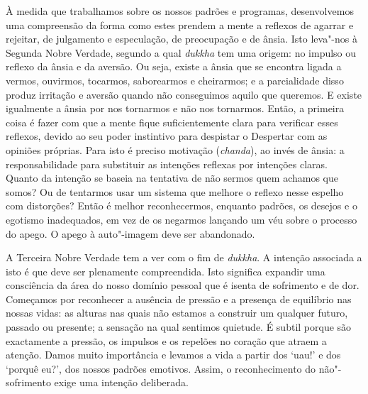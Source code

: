 À medida que trabalhamos sobre os nossos padrões e programas, desenvolvemos uma
compreensão da forma como estes prendem a mente a reflexos de agarrar e
rejeitar, de julgamento e especulação, de preocupação e de ânsia. Isto leva"-nos
à Segunda Nobre Verdade, segundo a qual \emph{dukkha} tem uma origem: no impulso
ou reflexo da ânsia e da aversão. Ou seja, existe a ânsia que se encontra ligada
a vermos, ouvirmos, tocarmos, saborearmos e cheirarmos; e a parcialidade disso
produz irritação e aversão quando não conseguimos aquilo que queremos. E existe
igualmente a ânsia por nos tornarmos e não nos tornarmos. Então, a primeira
coisa é fazer com que a mente fique suficientemente clara para verificar esses
reflexos, devido ao seu poder instintivo para despistar o Despertar com as
opiniões próprias. Para isto é preciso motivação (\emph{chanda}), ao invés de
ânsia: a responsabilidade para substituir as intenções reflexas por intenções
claras. Quanto da intenção se baseia na tentativa de não sermos quem achamos que
somos? Ou de tentarmos usar um sistema que melhore o reflexo nesse espelho com
distorções? Então é melhor reconhecermos, enquanto padrões, os desejos e o
egotismo inadequados, em vez de os negarmos lançando um véu sobre o processo do
apego. O apego à auto"-imagem deve ser abandonado.

A Terceira Nobre Verdade tem a ver com o fim de \emph{dukkha}. A intenção
associada a isto é que deve ser plenamente compreendida. Isto significa expandir
uma consciência da área do nosso domínio pessoal que é isenta de sofrimento e de
dor. Começamos por reconhecer a ausência de pressão e a presença de equilíbrio
nas nossas vidas: as alturas nas quais não estamos a construir um qualquer
futuro, passado ou presente; a sensação na qual sentimos quietude. É subtil
porque são exactamente a pressão, os impulsos e os repelões no coração que
atraem a atenção. Damos muito importância e levamos a vida a partir dos `uau!' e
dos `porquê eu?', dos nossos padrões emotivos. Assim, o reconhecimento do
não"-sofrimento exige uma intenção deliberada.

